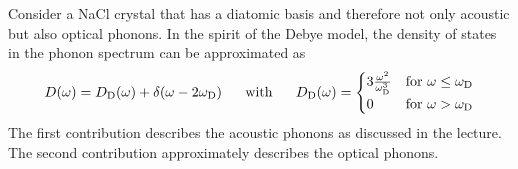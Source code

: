 Consider a NaCl crystal that has a diatomic basis and therefore not only 
acoustic but also optical phonons. In the spirit of the Debye model, the 
density of states in the phonon spectrum can be approximated as
\begin{equation}
    D(\omega)
    =D_\textnormal{D}(\omega)+\delta(\omega-2\omega_\textnormal{D})
    \ \ \ \ \ 
    \textnormal{with}
    \ \ \ \ \ 
    D_\textnormal{D}(\omega)=
    \begin{cases}
        3\frac{\omega^2}{\omega_\textnormal{D}^3} 
        & \textnormal{for } \omega\le\omega_\textnormal{D} \\
        0 & \textnormal{for } \omega>\omega_\textnormal{D}
    \end{cases}
\end{equation}
The first contribution describes the acoustic phonons as discussed in 
the lecture. The second contribution approximately describes the optical 
phonons. 

